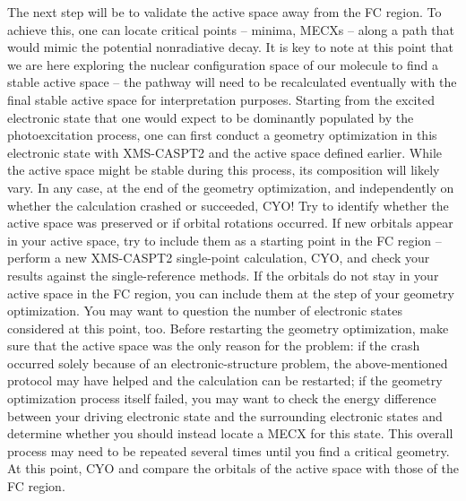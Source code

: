 \documentclass[9pt,bestpractices,pubversion]{livecoms}
\begin{document}
The next step will be to validate the active space away from the FC region. To achieve this, one can locate critical points -- minima, MECXs -- along a path that would mimic the potential nonradiative decay. It is key to note at this point that we are here exploring the nuclear configuration space of our molecule to find a stable active space -- the pathway will need to be recalculated eventually with the final stable active space for interpretation purposes. Starting from the excited electronic state that one would expect to be dominantly populated by the photoexcitation process, one can first conduct a geometry optimization in this electronic state with XMS-CASPT2 and the active space defined earlier. While the active space might be stable during this process, its composition will likely vary. In any case, at the end of the geometry optimization, and independently on whether the calculation crashed or succeeded, CYO! Try to identify whether the active space was preserved or if orbital rotations occurred. If new orbitals appear in your active space, try to include them as a starting point in the FC region -- perform a new XMS-CASPT2 single-point calculation, CYO, and check your results against the single-reference methods. If the orbitals do not stay in your active space in the FC region, you can include them at the step of your geometry optimization. You may want to question the number of electronic states considered at this point, too.
Before restarting the geometry optimization, make sure that the active space was the only reason for the problem: if the crash occurred solely because of an electronic-structure problem, the above-mentioned protocol may have helped and the calculation can be restarted; if the geometry optimization process itself failed, you may want to check the energy difference between your driving electronic state and the surrounding electronic states and determine whether you should instead locate a MECX for this state. This overall process may need to be repeated several times until you find a critical geometry. At this point, CYO and compare the orbitals of the active space with those of the FC region. 
\end{document}
